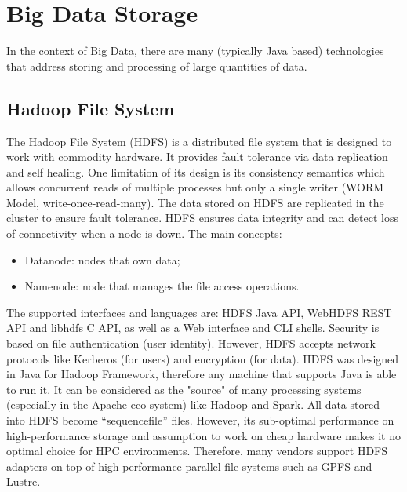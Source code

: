 \documentclass{../../template/esiwace-report}
\begin{document}

\section{Big Data Storage}
In the context of Big Data, there are many (typically Java based) technologies that address storing and processing of large quantities of data.


\subsection{Hadoop File System}
The Hadoop File System (HDFS) is a distributed file system that is designed to work with commodity hardware.
It provides fault tolerance via data replication and self healing.
One limitation of its design is its consistency semantics which allows concurrent reads of multiple processes but only a single writer (WORM Model, write-once-read-many).
The data stored on HDFS are replicated in the cluster to ensure fault tolerance. HDFS ensures data integrity and can detect loss of connectivity when a node is down. 
The main concepts:
\begin{itemize}
\item Datanode: nodes that own data;
\item Namenode: node that manages the file access operations.
\end{itemize}
The supported interfaces and languages are: HDFS Java API, WebHDFS REST API and libhdfs C API, as well as a Web interface and CLI shells.
Security is based on file authentication (user identity). However, HDFS accepts network protocols like Kerberos (for users) and encryption (for data).
HDFS was designed in Java for Hadoop Framework, therefore any machine that supports Java is able to run it. 
It can be considered as the "source" of many processing systems (especially in the Apache eco-system) like Hadoop and Spark. All data stored into HDFS become “sequencefile” files.
However, its sub-optimal performance on high-performance storage and assumption to work on cheap hardware makes it no optimal choice for HPC environments. Therefore, many vendors support HDFS adapters on top of high-performance parallel file systems such as GPFS and Lustre.
\end{document}

